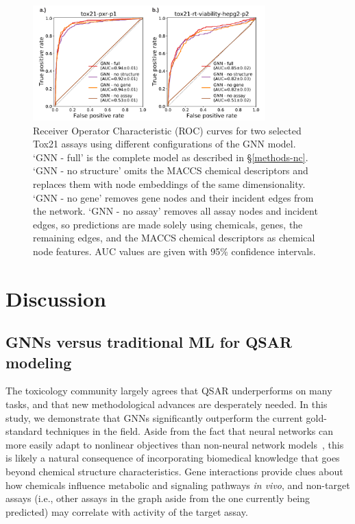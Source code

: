 \documentclass{ws-procs11x85}
\begin{document}
\begin{figure}
   \centering
   \includegraphics[width=0.8\textwidth]{figures/figure5.pdf}
   \caption{Receiver Operator Characteristic (ROC) curves for two selected Tox21 assays using different configurations of the GNN model. `GNN - full' is the complete model as described in \S\ref{methods-nc}. `GNN - no structure' omits the MACCS chemical descriptors and replaces them with node embeddings of the same dimensionality. `GNN - no gene' removes gene nodes and their incident edges from the network. `GNN - no assay' removes all assay nodes and incident edges, so predictions are made solely using chemicals, genes, the remaining edges, and the MACCS chemical descriptors as chemical node features. AUC values are given with 95\% confidence intervals.}\label{fig:5}
\end{figure}

\section{Discussion}

\subsection{GNNs versus traditional ML for QSAR modeling}
The toxicology community largely agrees that QSAR underperforms on many tasks, and that new methodological advances are desperately needed.
In this study, we demonstrate that GNNs significantly outperform the current gold-standard techniques in the field.
Aside from the fact that neural networks can more easily adapt to nonlinear objectives than non-neural network models~\cite{hornik1989multilayer}, this is likely a natural consequence of incorporating biomedical knowledge that goes beyond chemical structure characteristics.
Gene interactions provide clues about how chemicals influence metabolic and signaling pathways \textit{in vivo}, and non-target assays (i.e., other assays in the graph aside from the one currently being predicted) may correlate with activity of the target assay.
\end{document}
